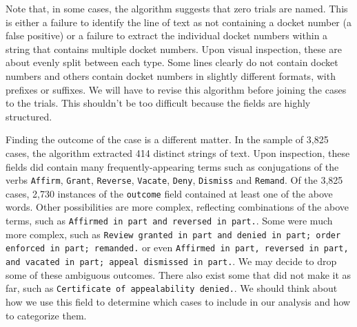 \documentclass[11pt]{paper}
\begin{document}
\noindent Note that, in some cases, the algorithm suggests that 
zero trials are named. 
This is either a failure to identify the line of text as not containing 
a docket number (a false positive) or a failure to extract the individual 
docket numbers within a string that contains multiple docket numbers. 
Upon visual inspection, these are about evenly split between each type.
Some lines clearly do not contain docket numbers
and others contain docket numbers in slightly different formats, with prefixes or suffixes. 
We will have to revise this algorithm before joining the cases to the trials. 
This shouldn't be too difficult because the fields are highly structured. 

Finding the outcome of the case is a different matter. 
In the sample of 3,825 cases, the algorithm extracted 414 distinct strings of text. 
Upon inspection, these fields did contain many frequently-appearing terms
such as conjugations of the verbs 
\texttt{Affirm}, 
\texttt{Grant}, 
\texttt{Reverse},
\texttt{Vacate}, 
\texttt{Deny},
\texttt{Dismiss}  and 
\texttt{Remand}.
Of the 3,825 cases, 2,730 instances of the \texttt{outcome} field
contained at least one of the above words. 
Other possibilities are more complex, 
reflecting combinations of the above terms,
such as \texttt{Affirmed in part and reversed in part.}.
Some were much more complex, such as 
\texttt{Review granted in part and denied in part; order enforced in part; remanded.} or even
\texttt{Affirmed in part, reversed in part, and vacated in part; appeal dismissed in part.}. 
We may decide to drop some of these ambiguous outcomes. 
There also exist some that did not make it as far, 
such as \texttt{Certificate of appealability denied.}.
We should think about how we use this field to determine which cases to 
include in our analysis and how to categorize them. 



% 
\end{document}
